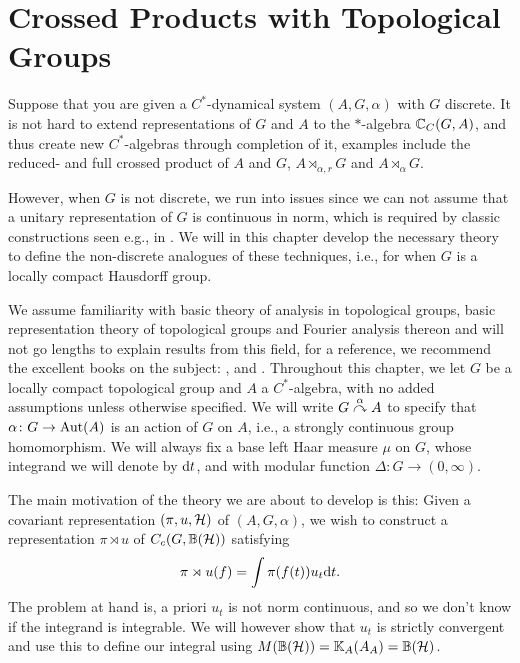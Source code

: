 \chapter{Crossed Products with Topological Groups}
Suppose that you are given a $C^*$-dynamical system $(A,G,\alpha)$ with $G$ discrete. It is not hard to extend representations of $G$ and $A$ to the $*$-algebra $\mathbb{C}_C(G,A)$, and thus create new $C^*$-algebras through completion of it, examples include the reduced- and full crossed product of $A$ and $G$, $A \rtimes_{\alpha,r} G$ and $A \rtimes_{\alpha} G$.

However, when $G$ is not discrete, we run into issues since we can not assume that a unitary representation of $G$ is continuous in norm, which is required by classic constructions seen e.g., in \cite{brown2008c}. We will in this chapter develop the necessary theory to define the non-discrete analogues of these techniques, i.e., for when $G$ is a locally compact Hausdorff group.

We assume familiarity with basic theory of analysis in topological groups, basic representation theory of topological groups and Fourier analysis thereon and will not go lengths to explain results from this field, for a reference, we recommend the excellent books on the subject: \cite{folland2016fourier}, \cite{berg1984harmonic} and \cite{folland2013real}. 
Throughout this chapter, we let $G$ be a locally compact topological group and $A$ a $C^*$-algebra, with no added assumptions unless otherwise specified. We will write $G \stackrel{\alpha}{\curvearrowright} A$ to specify that $\alpha \colon G \to \operatorname{Aut}(A)$ is an action of $G$ on $A$, i.e., a strongly continuous group homomorphism. We will always fix a base left Haar measure $\mu$ on $G$, whose integrand we will denote by $\mathrm{d} t$, and with modular function $\Delta \colon G \to (0,\infty)$. 

The main motivation of the theory we are about to develop is this: Given a covariant representation $(\pi,u,\mathcal{H})$ of $(A,G,\alpha)$, we wish to construct a representation $\pi \rtimes u$ of $C_c(G,\mathbb{B}(\mathcal{H}))$ satisfying 
\begin{align*}
	\pi \rtimes u (f) = \int \pi(f(t))u_t \mathrm{d} t.
\end{align*}
The problem at hand is, a priori $u_t$ is not norm continuous, and so we don't know if the integrand is integrable. We will however show that $u_t$ is strictly convergent and use this to define our integral using $M(\mathbb{B}(\mathcal{H})) = \mathbb{K}_A(A_A)= \mathbb{B}(\mathcal{H})$. 

